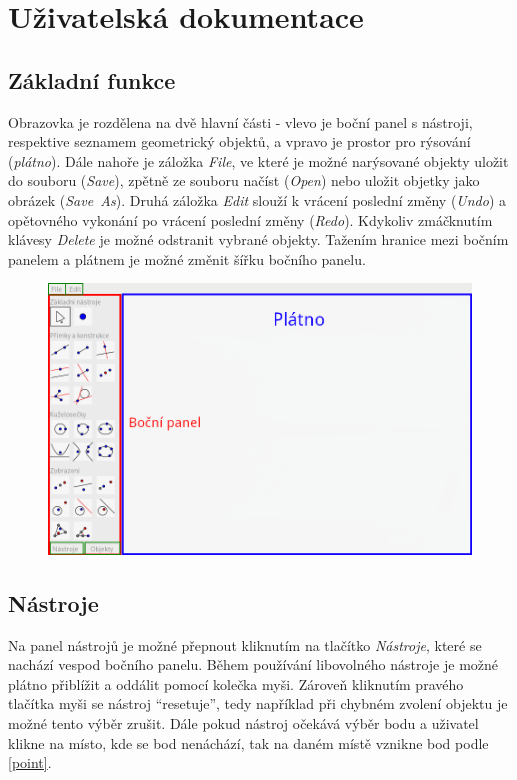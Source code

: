 \documentclass[11pt]{article}
\begin{document}
    \section{Uživatelská dokumentace}
    \subsection{Základní funkce}
    Obrazovka je rozdělena na dvě hlavní části - vlevo je boční panel s nástroji, respektive seznamem geometrický objektů, a vpravo je prostor pro rýsování (\textit{plátno}). Dále nahoře je záložka \textit{File}, ve které je možné narýsované objekty uložit do souboru (\textit{Save}), zpětně ze souboru načíst (\textit{Open}) nebo uložit objetky jako obrázek (\textit{Save~As}). Druhá záložka \textit{Edit} slouží k vrácení poslední změny (\textit{Undo}) a opětovného vykonání po vrácení poslední změny (\textit{Redo}). Kdykoliv zmáčknutím klávesy \textit{Delete} je možné odstranit vybrané objekty. Tažením hranice mezi bočním panelem a plátnem je možné změnit šířku bočního panelu.
    \begin{figure}[h]
        \begin{center}
        \includegraphics[scale=0.4]{imgs/overview.png}
        \end{center}
    \end{figure}
    \subsection{Nástroje}
    Na panel nástrojů je možné přepnout kliknutím na tlačítko \textit{Nástroje}, které se nachází vespod bočního panelu. Během používání libovolného nástroje je možné plátno přiblížit a oddálit pomocí kolečka myši. Zároveň kliknutím pravého tlačítka myši se nástroj \enquote{resetuje}, tedy například při chybném zvolení objektu je možné tento výběr zrušit. Dále pokud nástroj očekává výběr bodu a uživatel klikne na místo, kde se bod nenáchází, tak na daném místě vznikne bod podle \ref{point}.
\end{document}
